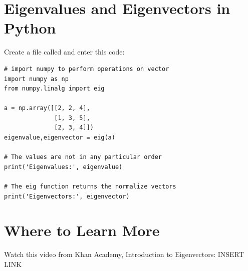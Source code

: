 \section{Eigenvalues and Eigenvectors in Python}
Create a file called  and enter this code:

\begin{Verbatim}
# import numpy to perform operations on vector
import numpy as np
from numpy.linalg import eig

a = np.array([[2, 2, 4], 
              [1, 3, 5],
              [2, 3, 4]])
eigenvalue,eigenvector = eig(a)

# The values are not in any particular order
print('Eigenvalues:', eigenvalue)

# The eig function returns the normalize vectors
print('Eigenvectors:', eigenvector)

\end{Verbatim}

\section{Where to Learn More}
Watch this video from Khan Academy,  Introduction to Eigenvectors: INSERT LINK